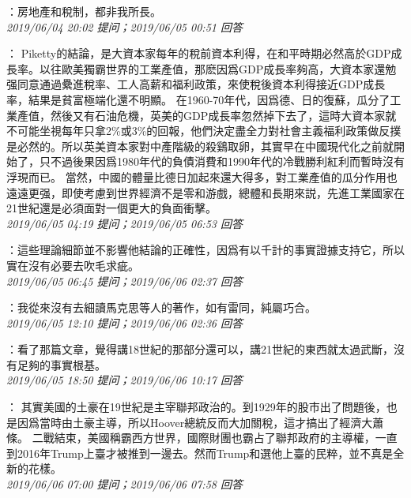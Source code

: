 \documentclass[twocolumn]{ctexart}
\begin{document}
：房地產和稅制，都非我所長。
\\

\textit{\hfill\noindent\small 2019/06/04 20:02 提问；2019/06/05 00:51 回答}

：
Piketty的結論，是大資本家每年的稅前資本利得，在和平時期必然高於GDP成長率。以往歐美獨霸世界的工業產值，那麽因爲GDP成長率夠高，大資本家還勉强同意通過纍進稅率、工人高薪和福利政策，來使稅後資本利得接近GDP成長率，結果是貧富極端化還不明顯。 
在1960-70年代，因爲德、日的復蘇，瓜分了工業產值，然後又有石油危機，英美的GDP成長率忽然掉下去了，這時大資本家就不可能坐視每年只拿2\%或3\%的回報，他們決定盡全力對社會主義福利政策做反撲是必然的。所以英美資本家對中產階級的殺鷄取卵，其實早在中國現代化之前就開始了，只不過後果因爲1980年代的負債消費和1990年代的冷戰勝利紅利而暫時沒有浮現而已。 
當然，中國的體量比德日加起來還大得多，對工業產值的瓜分作用也遠遠更强，即使考慮到世界經濟不是零和游戲，總體和長期來説，先進工業國家在21世紀還是必須面對一個更大的負面衝擊。
\\

\textit{\hfill\noindent\small 2019/06/05 04:19 提问；2019/06/05 06:53 回答}

：這些理論細節並不影響他結論的正確性，因爲有以千計的事實證據支持它，所以實在沒有必要去吹毛求疵。
\\

\textit{\hfill\noindent\small 2019/06/05 06:45 提问；2019/06/06 02:37 回答}

：我從來沒有去細讀馬克思等人的著作，如有雷同，純屬巧合。
\\

\textit{\hfill\noindent\small 2019/06/05 12:10 提问；2019/06/06 02:36 回答}

：看了那篇文章，覺得講18世紀的那部分還可以，講21世紀的東西就太過武斷，沒有足夠的事實根基。
\\

\textit{\hfill\noindent\small 2019/06/05 18:50 提问；2019/06/06 10:17 回答}

：
其實美國的土豪在19世紀是主宰聯邦政治的。到1929年的股市出了問題後，也是因爲當時由土豪主導，所以Hoover總統反而大加關稅，這才搞出了經濟大蕭條。 
二戰結束，美國稱霸西方世界，國際財團也霸占了聯邦政府的主導權，一直到2016年Trump上臺才被推到一邊去。然而Trump和選他上臺的民粹，並不真是全新的花樣。
\\

\textit{\hfill\noindent\small 2019/06/06 07:00 提问；2019/06/06 07:58 回答}
\end{document}
